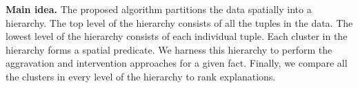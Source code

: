 %
%
%

{\bf Main idea.} The proposed algorithm partitions the data spatially into a hierarchy. 
The top level of the hierarchy consists of all the tuples in the data. 
The lowest level of the hierarchy consists of each individual tuple. 
Each cluster in the hierarchy forms a spatial predicate. 
We harness this hierarchy to perform the aggravation and intervention approaches for a given fact. 
Finally, we compare all the clusters in every level of the hierarchy to rank explanations.

